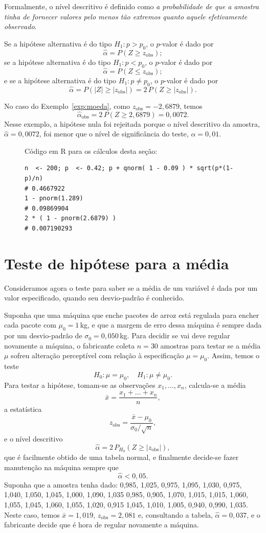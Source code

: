 \documentclass[12pt,a4paper]{article}
\theoremstyle{plain}
\theoremstyle{definition}
\theoremstyle{remark}
\newenvironment{example}{\pushQED{\qed}\renewcommand{\qedsymbol}{\scriptsize$\triangle$}\examplex}{\popQED\endexamplex}
\begin{document}
Formalmente, o nível descritivo é definido como \emph{a probabilidade de que a amostra tinha de fornecer valores pelo menos tão extremos quanto aquele efetivamente observado}.

Se a hipótese alternativa é do tipo $H_1:p>p_0$, o $p$-valor é dado por
\[
\hat{\alpha}
=
P(Z \geq z_{\mathrm{obs}})
;
\]
se a hipótese alternativa é do tipo $H_1:p < p_0$, o $p$-valor é dado por
\[
\hat{\alpha}
=
P(Z \leq z_{\mathrm{obs}})
;
\]
e se a hipótese alternativa é do tipo $H_1:p \ne p_0$, o $p$-valor é dado por
\[
\hat{\alpha}
=
P(|Z| \geq |z_{\mathrm{obs}}|)
=
2\, P(Z \geq |z_{\mathrm{obs}}|)
.
\]

No caso do Exemplo~\ref{exp:moeda}, como $z_{\mathrm{obs}}=-2,6879$, temos
\[
\hat{\alpha}_{\mathrm{obs}}
=
2\, P(Z \geq 2,6879)
=
0,0072
.
\]
Nesse exemplo, a hipótese nula foi rejeitada porque o nível descritivo da amostra, $\hat{\alpha}=0,0072$, foi menor que o nível de significância do teste, $\alpha=0,01$.

\begin{figure}[H]
Código em R para os cálculos desta seção:
\footnotesize
\begin{verbatim}
n  <- 200; p  <- 0.42; p + qnorm( 1 - 0.09 ) * sqrt(p*(1-p)/n)
# 0.4667922
1 - pnorm(1.289)
# 0.09869904
2 * ( 1 - pnorm(2.6879) )
# 0.007190293
\end{verbatim}
\end{figure}


\section{Teste de hipótese para a média}

Consideramos agora o teste para saber se a média de um variável é dada por um valor especificado, quando seu desvio-padrão é conhecido.

\begin{example}
Suponha que uma máquina que enche pacotes de arroz está regulada para encher cada pacote com $\mu_0=1\,$kg, e que a margem de erro dessa máquina é sempre dada por um desvio-padrão de $\sigma_0=0,050\,$kg.
Para decidir se vai deve regular novamente a máquina, o fabricante coleta $n=30$ amostras para testar se a média $\mu$ sofreu alteração perceptível com relação à especificação $\mu=\mu_0$.
Assim, temos o teste
\[
H_0: \mu=\mu_0, \quad H_1: \mu\ne\mu_0
.
\]
Para testar a hipótese, tomam-se as observações $x_1,\dots,x_n$, calcula-se a média
\[
\bar{x} = \frac{x_1+\dots+x_n}{n}
,
\]
a estatística
\[
z_{\mathrm{obs}} = \frac{\bar x - \mu_0}{\sigma_0 / \sqrt{n}}
,
\]
e o nível descritivo
\[
\hat{\alpha} = 2 \, P_{H_0}(Z \geq |z_{\mathrm{obs}}|)
,
\]
que é facilmente obtido de uma tabela normal, e finalmente decide-se fazer manutenção na máquina sempre que
\[
\hat{\alpha} < 0,05.
\]
Suponha que a amostra tenha dado:
0,985, 1,025, 0,975, 1,095, 1,030, 0,975, 1,040, 1,050, 1,045, 1,000, 1,090, 1,035
0,985, 0,905, 1,070, 1,015, 1,015, 1,060, 1,055, 1,045, 1,060, 1,055, 1,020, 0,915
1,045, 1,010, 1,005, 0,940, 0,990, 1,035.
Neste caso, temos $\bar{x}=1,019$, $z_{\mathrm{obs}}=2,081$ e, consultando a tabela, $\hat{\alpha}=0,037$, e o fabricante decide que é hora de regular novamente a máquina.
\end{example}
\end{document}
